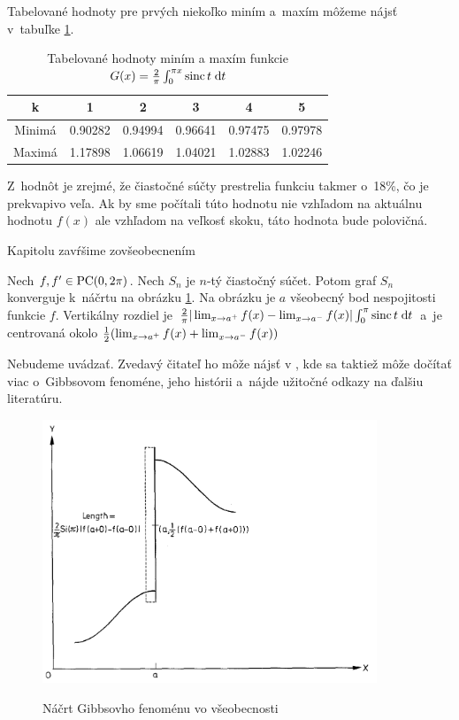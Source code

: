 Tabelované hodnoty pre prvých niekoľko miním a~maxím môžeme nájsť 
v~tabuľke \ref{tab:gibbs_table}. 

\begin{table}[htb]
    \centering
    \begin{tabular}{c|c|c|c|c|c|}
        k&1&2&3&4&5 \\ \hline
        Minimá &0.90282&0.94994&0.96641&0.97475&0.97978 \\
        Maximá &1.17898&1.06619&1.04021&1.02883&1.02246
    \end{tabular}
    \caption{Tabelované hodnoty miním a maxím funkcie $G(x) =
    \frac{2}{\pi} \int_0^{\pi x} \operatorname{sinc} t \; \mathrm{d} t$}
    \label{tab:gibbs_table}
\end{table}

Z~hodnôt je zrejmé, že čiastočné súčty prestrelia funkciu takmer 
o~18\%, čo je prekvapivo veľa. Ak by sme počítali túto hodnotu nie
vzhľadom na aktuálnu hodnotu $f(x)$ ale vzhľadom na veľkosť skoku,
táto hodnota bude polovičná. 

Kapitolu zavŕšime zovšeobecnením
\begin{veta}
    Nech $f,f'\in\mbox{PC}(0,2\pi)$. Nech $S_n$ je $n$-tý čiastočný súčet.
    Potom graf $S_n$ konverguje k~náčrtu na obrázku
    \ref{fig:gibbs_figura}.
    Na obrázku je $a$ všeobecný bod nespojitosti funkcie $f$.
    Vertikálny rozdiel je 
    $\frac{2}{\pi} |\lim_{x\rightarrow a^+} f(x) - \lim_{x\rightarrow a^-} f(x)|
    \int_0^{\pi} \operatorname{sinc} t \; \mathrm{d} t$ a~je
    centrovaná okolo 
    $\frac{1}{2}(\lim_{x\rightarrow a^+} f(x) + \lim_{x\rightarrow a^-} f(x))$
\end{veta}
\begin{dokaz}
    Nebudeme uvádzať. Zvedavý čitateľ ho môže nájsť v \cite{hewitt},
    kde sa taktiež môže dočítať viac o~Gibbsovom fenoméne, jeho
    histórii a~nájde užitočné odkazy na ďalšiu literatúru.
\end{dokaz}

\begin{figure}[htp]
    \centering
    \includegraphics[width=10cm]{obrazky/transformacia/gibbs/gibbs_figura}
    \label{fig:gibbs_figura}
    \caption{Náčrt Gibbsovho fenoménu vo všeobecnosti}
\end{figure}
